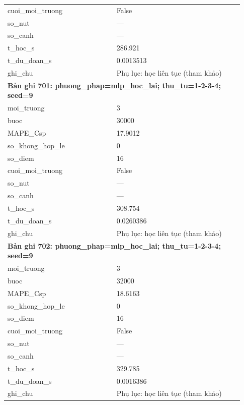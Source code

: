 \begin{longtable}{p{0.43\linewidth}p{0.50\linewidth}}
cuoi\_\allowbreak moi\_\allowbreak truong & False \\
so\_\allowbreak nut & — \\
so\_\allowbreak canh & — \\
t\_\allowbreak hoc\_\allowbreak s & 286.921 \\
t\_\allowbreak du\_\allowbreak doan\_\allowbreak s & 0.0013513 \\
ghi\_\allowbreak chu & Phụ lục: học liên tục (tham khảo) \\
\midrule
\multicolumn{2}{p{0.95\linewidth}}{\textbf{Bản ghi 701: phuong\_phap=mlp\_hoc\_lai; thu\_tu=1-2-3-4; seed=9}} \\
moi\_\allowbreak truong & 3 \\
buoc & 30000 \\
MAPE\_\allowbreak Csp & 17.9012 \\
so\_\allowbreak khong\_\allowbreak hop\_\allowbreak le & 0 \\
so\_\allowbreak diem & 16 \\
cuoi\_\allowbreak moi\_\allowbreak truong & False \\
so\_\allowbreak nut & — \\
so\_\allowbreak canh & — \\
t\_\allowbreak hoc\_\allowbreak s & 308.754 \\
t\_\allowbreak du\_\allowbreak doan\_\allowbreak s & 0.0260386 \\
ghi\_\allowbreak chu & Phụ lục: học liên tục (tham khảo) \\
\midrule
\multicolumn{2}{p{0.95\linewidth}}{\textbf{Bản ghi 702: phuong\_phap=mlp\_hoc\_lai; thu\_tu=1-2-3-4; seed=9}} \\
moi\_\allowbreak truong & 3 \\
buoc & 32000 \\
MAPE\_\allowbreak Csp & 18.6163 \\
so\_\allowbreak khong\_\allowbreak hop\_\allowbreak le & 0 \\
so\_\allowbreak diem & 16 \\
cuoi\_\allowbreak moi\_\allowbreak truong & False \\
so\_\allowbreak nut & — \\
so\_\allowbreak canh & — \\
t\_\allowbreak hoc\_\allowbreak s & 329.785 \\
t\_\allowbreak du\_\allowbreak doan\_\allowbreak s & 0.0016386 \\
ghi\_\allowbreak chu & Phụ lục: học liên tục (tham khảo) \\

\end{longtable}
